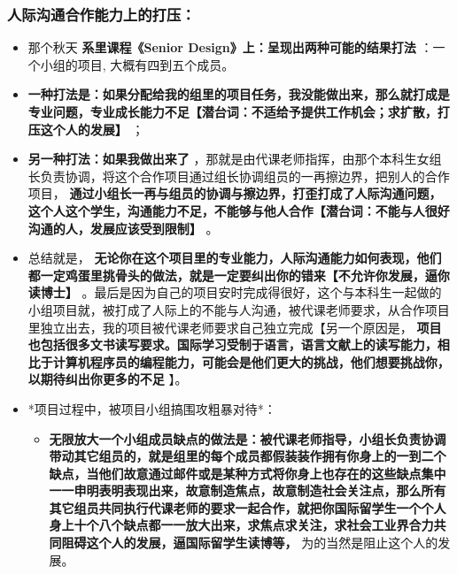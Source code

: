 \documentclass[9pt, b5paper]{article}
\begin{document}
\subsubsection{人际沟通合作能力上的打压：}
\label{sec-3-1-2}
\begin{itemize}
\item 那个秋天 \textbf{系里课程《Senior Design》上：呈现出两种可能的结果打法} ：一个小组的项目, 大概有四到五个成员。
\item \textbf{一种打法是：如果分配给我的组里的项目任务，我没能做出来，那么就打成是专业问题，专业成长能力不足【潜台词：不适给予提供工作机会；求扩散，打压这个人的发展】} ；
\item \textbf{另一种打法：如果我做出来了} ，那就是由代课老师指挥，由那个本科生女组长负责协调，将这个合作项目通过组长协调组员的一再擦边界，把别人的合作项目， \textbf{通过小组长一再与组员的协调与擦边界，打歪打成了人际沟通问题，这个人这个学生，沟通能力不足，不能够与他人合作【潜台词：不能与人很好沟通的人，发展应该受到限制】} 。
\item 总结就是， \textbf{无论你在这个项目里的专业能力，人际沟通能力如何表现，他们都一定鸡蛋里挑骨头的做法，就是一定要纠出你的错来【不允许你发展，逼你读博士】} 。最后是因为自己的项目安时完成得很好，这个与本科生一起做的小组项目就，被打成了人际上的不能与人沟通，被代课老师要求，从合作项目里独立出去，我的项目被代课老师要求自己独立完成【另一个原因是， \textbf{项目也包括很多文书读写要求。国际学习受制于语言，语言文献上的读写能力，相比于计算机程序员的编程能力，可能会是他们更大的挑战，他们想要挑战你，以期待纠出你更多的不足} 】。
\item *项目过程中，被项目小组搞围攻粗暴对待*： 
\begin{itemize}
\item \textbf{无限放大一个小组成员缺点的做法是：被代课老师指导，小组长负责协调带动其它组员的，就是组里的每个成员都假装装作拥有你身上的一到二个缺点，当他们故意通过邮件或是某种方式将你身上也存在的这些缺点集中一一申明表明表现出来，故意制造焦点，故意制造社会关注点，那么所有其它组员共同执行代课老师的要求一起合作，就把你国际留学生一个个人身上十个八个缺点都一一放大出来，求焦点求关注，求社会工业界合力共同阻碍这个人的发展，逼国际留学生读博等，} 为的当然是阻止这个人的发展。
\end{itemize}
\end{itemize}
\end{document}
